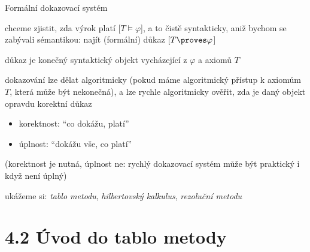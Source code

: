 \documentclass{beamer}
\begin{document}
\begin{frame}{Formální dokazovací systém}

    chceme zjistit, zda výrok platí [\alert{$T\models\varphi$}], a to čistě syntakticky, aniž bychom se zabývali sémantikou: najít \alert{(formální) důkaz} [\alert{$T\proves\varphi$}]

    \pause
    \alert{důkaz} je konečný syntaktický objekt vycházející z $\varphi$ a axiomů $T$

    \pause
    dokazování lze dělat \alert{algoritmicky} (pokud máme algoritmický přístup k axiomům $T$, která může být nekonečná), a lze rychle algoritmicky \alert{ověřit}, zda je daný objekt opravdu korektní důkaz

    \pause
    \begin{itemize}
        \item \alert{korektnost}: ``co dokážu, platí'' \hfill {}
        \item \alert{úplnost}: ``dokážu vše, co platí'' \hfill {}
    \end{itemize}
    \pause
    (korektnost je nutná, úplnost ne: rychlý dokazovací systém může být praktický i když není úplný)

    \pause
    ukážeme si: \emph{tablo metodu}, \emph{hilbertovský kalkulus}, \emph{rezoluční metodu}
    
    \pause

\end{frame}


\section{4.2 Úvod do tablo metody}
\end{document}
